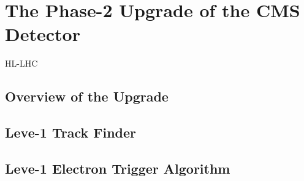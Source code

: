 \chapter{The Phase-2 Upgrade of the CMS Detector}

\ac{HL-LHC}

\section{Overview of the Upgrade}

\section{Leve-1 Track Finder}

\section{Leve-1 Electron Trigger Algorithm}